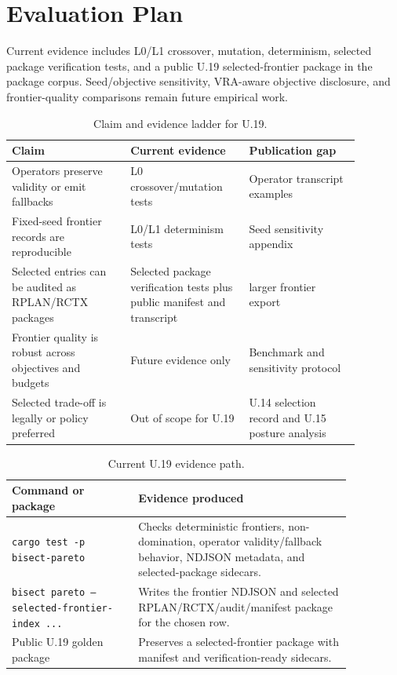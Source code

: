 \section{Evaluation Plan}

Current evidence includes L0/L1 crossover, mutation, determinism, selected
package verification tests, and a public U.19 selected-frontier package in the
package corpus. Seed/objective sensitivity, VRA-aware objective disclosure, and
frontier-quality comparisons remain future empirical work.

\begin{table}[htbp]
\centering
\small
\begin{tabular}{p{0.30\linewidth}p{0.30\linewidth}p{0.28\linewidth}}
\toprule
Claim & Current evidence & Publication gap \\
\midrule
Operators preserve validity or emit fallbacks & L0 crossover/mutation tests &
Operator transcript examples \\
Fixed-seed frontier records are reproducible & L0/L1 determinism tests &
Seed sensitivity appendix \\
Selected entries can be audited as RPLAN/RCTX packages & Selected package
verification tests plus public manifest and transcript & larger frontier
export \\
Frontier quality is robust across objectives and budgets & Future evidence only
& Benchmark and sensitivity protocol \\
Selected trade-off is legally or policy preferred & Out of scope for U.19 &
U.14 selection record and U.15 posture analysis \\
\bottomrule
\end{tabular}
\caption{Claim and evidence ladder for U.19.}
\end{table}

\begin{table}[htbp]
\centering
\small
\begin{tabular}{p{0.32\linewidth}p{0.54\linewidth}}
\toprule
Command or package & Evidence produced \\
\midrule
\texttt{cargo test -p bisect-pareto} & Checks deterministic frontiers,
non-domination, operator validity/fallback behavior, NDJSON metadata, and
selected-package sidecars. \\
\texttt{bisect pareto --selected-frontier-index ...} & Writes the frontier
NDJSON and selected RPLAN/RCTX/audit/manifest package for the chosen row. \\
Public U.19 golden package & Preserves a selected-frontier package with
manifest and verification-ready sidecars. \\
\bottomrule
\end{tabular}
\caption{Current U.19 evidence path.}
\end{table}

